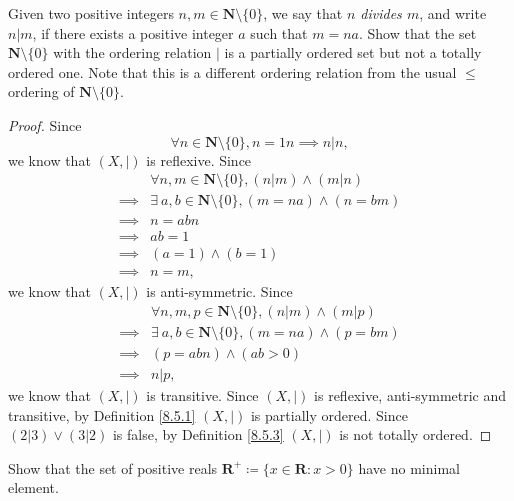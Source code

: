 \begin{exercise}\label{ex 8.5.3}
    Given two positive integers \(n, m \in \mathbf{N} \setminus \{0\}\), we say that \emph{\(n\) divides \(m\)}, and write \(n | m\), if there exists a positive integer \(a\) such that \(m = na\).
    Show that the set \(\mathbf{N} \setminus \{0\}\) with the ordering relation \(|\) is a partially ordered set but not a totally ordered one.
    Note that this is a different ordering relation from the usual \(\leq\) ordering of \(\mathbf{N} \setminus \{0\}\).
\end{exercise}

\begin{proof}
    Since
    \[
        \forall n \in \mathbf{N} \setminus \{0\}, n = 1n \implies n | n,
    \]
    we know that \((X, |)\) is reflexive.
    Since
    \begin{align*}
                 & \forall n, m \in \mathbf{N} \setminus \{0\}, (n | m) \land (m | n)    \\
        \implies & \exists\ a, b \in \mathbf{N} \setminus \{0\}, (m = na) \land (n = bm) \\
        \implies & n = abn                                                               \\
        \implies & ab = 1                                                                \\
        \implies & (a = 1) \land (b = 1)                                                 \\
        \implies & n = m,
    \end{align*}
    we know that \((X, |)\) is anti-symmetric.
    Since
    \begin{align*}
                 & \forall n, m, p \in \mathbf{N} \setminus \{0\}, (n | m) \land (m | p) \\
        \implies & \exists\ a, b \in \mathbf{N} \setminus \{0\}, (m = na) \land (p = bm) \\
        \implies & (p = abn) \land (ab > 0)                                              \\
        \implies & n | p,
    \end{align*}
    we know that \((X, |)\) is transitive.
    Since \((X, |)\) is reflexive, anti-symmetric and transitive, by Definition \ref{8.5.1} \((X, |)\) is partially ordered.
    Since \((2 | 3) \lor (3 | 2)\) is false, by Definition \ref{8.5.3} \((X, |)\) is not totally ordered.
\end{proof}

\begin{exercise}\label{ex 8.5.4}
    Show that the set of positive reals \(\mathbf{R}^+ \coloneqq \{x \in \mathbf{R} : x > 0\}\) have no minimal element.
\end{exercise}

